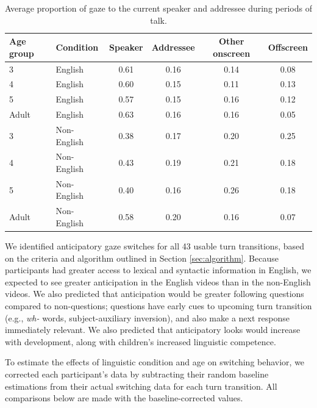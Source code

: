 \documentclass[authoryear, 12pt]{elsarticle}
\begin{document}
\begin{table}[t]
\begin{center}
  \begin{tabular}{llcccc}
    \hline
    Age group & Condition & Speaker & Addressee & Other onscreen & Offscreen\\ 
    \hline
    3 & English & 0.61 & 0.16 & 0.14 & 0.08 \\ 
    4 & English & 0.60 & 0.15 & 0.11 & 0.13 \\ 
    5 & English & 0.57 & 0.15 & 0.16 & 0.12 \\ 
    Adult & English & 0.63 & 0.16 & 0.16 & 0.05 \\ 
    3 & Non-English & 0.38 & 0.17 & 0.20 & 0.25 \\ 
    4 & Non-English & 0.43 & 0.19 & 0.21 & 0.18 \\ 
    5 & Non-English & 0.40 & 0.16 & 0.26 & 0.18 \\ 
    Adult & Non-English & 0.58 & 0.20 & 0.16 & 0.07 \\ 
    \hline
  \end{tabular}
\end{center}
  \caption{Average proportion of gaze to the current speaker and addressee during periods of talk.}
\label{tab:e1_look}
\end{table}

We identified anticipatory gaze switches for all 43 usable turn transitions, based on the criteria and algorithm outlined in Section \ref{sec:algorithm}. Because participants had greater access to lexical and syntactic information in English, we expected to see greater anticipation in the English videos than in the non-English videos. We also predicted that anticipation would be greater following questions compared to non-questions; questions have early cues to upcoming turn transition (e.g., \textit{wh-} words, subject-auxiliary inversion), and also make a next response immediately relevant. We also predicted that anticipatory looks would increase with development, along with children's increased linguistic competence.

To estimate the effects of linguistic condition and age on switching behavior, we corrected each participant's data by subtracting their random baseline estimations from their actual switching data for each turn transition. All comparisons below are made with the baseline-corrected values.
\end{document}
